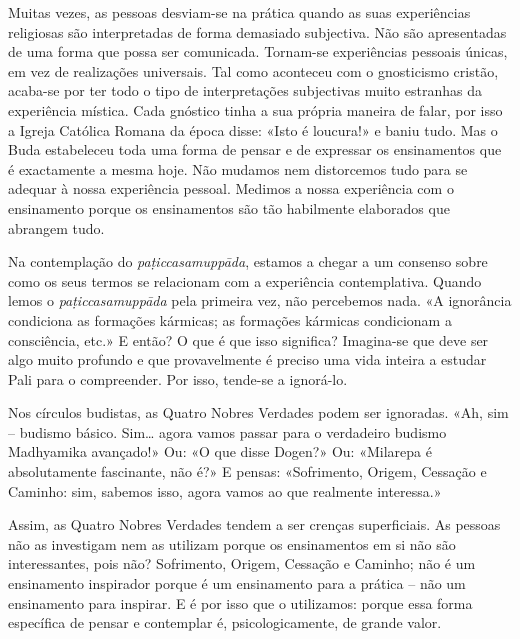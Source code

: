 Muitas vezes, as pessoas desviam-se na prática quando as suas experiências
religiosas são interpretadas de forma demasiado subjectiva. Não são apresentadas
de uma forma que possa ser comunicada. Tornam-se experiências pessoais únicas,
em vez de realizações universais. Tal como aconteceu com o gnosticismo cristão,
acaba-se por ter todo o tipo de interpretações subjectivas muito estranhas da
experiência mística. Cada gnóstico tinha a sua própria maneira de falar, por
isso a Igreja Católica Romana da época disse: «Isto é loucura!» e baniu tudo.
Mas o Buda estabeleceu toda uma forma de pensar e de expressar os ensinamentos
que é exactamente a mesma hoje. Não mudamos nem distorcemos tudo para se adequar
à nossa experiência pessoal. Medimos a nossa experiência com o ensinamento
porque os ensinamentos são tão habilmente elaborados que abrangem tudo.

Na contemplação do \emph{paṭiccasamuppāda}, estamos a chegar a um consenso sobre
como os seus termos se relacionam com a experiência contemplativa. Quando lemos
o \emph{paṭiccasamuppāda} pela primeira vez, não percebemos nada. «A ignorância
condiciona as formações kármicas; as formações kármicas condicionam a
consciência, etc.» E então? O que é que isso significa? Imagina-se que deve ser
algo muito profundo e que provavelmente é preciso uma vida inteira a estudar
Pali para o compreender. Por isso, tende-se a ignorá-lo.

Nos círculos budistas, as Quatro Nobres Verdades podem ser ignoradas. «Ah, sim
-- budismo básico. Sim\ldots{} agora vamos passar para o verdadeiro budismo
Madhyamika avançado!» Ou: «O que disse Dogen?» Ou: «Milarepa é absolutamente
fascinante, não é?» E pensas: «Sofrimento, Origem, Cessação e Caminho: sim,
sabemos isso, agora vamos ao que realmente interessa.»

Assim, as Quatro Nobres Verdades tendem a ser crenças superficiais. As pessoas
não as investigam nem as utilizam porque os ensinamentos em si não são
interessantes, pois não? Sofrimento, Origem, Cessação e Caminho; não é um
ensinamento inspirador porque é um ensinamento para a prática -- não um
ensinamento para inspirar. E é por isso que o utilizamos: porque essa forma
específica de pensar e contemplar é, psicologicamente, de grande valor.

